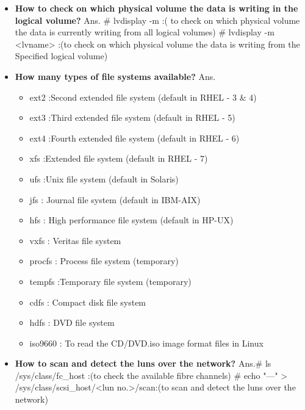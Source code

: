 \begin{enumerate}
\begin{enumerate}
{\begin{itemize}
   \bigskip
   \bigskip

   \item \textbf{How to check on which physical volume the data is writing in the logical volume?}
   \newline
   Ans. # lvdisplay    -m  :( to check  on which physical volume the data is currently writing from all 				logical volumes)
   # lvdisplay   -m   <lvname>	:(to check on which physical volume the data is writing from the Specified   logical volume)

   \bigskip
   \bigskip

   \item \textbf{How many types of file systems available?}
   \newline
   Ans. \begin{itemize}
           \item ext2 :Second extended file system (default in RHEL - 3 & 4)
           \item ext3 :Third extended file system (default in RHEL - 5)
           \item  ext4 :Fourth extended file system (default in RHEL - 6)
           \item  xfs :Extended file system (default in RHEL - 7)
           \item ufs  :Unix file system  (default in Solaris)	
           \item jfs : Journal file system  (default in IBM-AIX)
           \item hfs  : High performance file system (default in HP-UX)
           \item vxfs : Veritas file system
           \item procfs : Process file system (temporary)
           \item tempfs :Temporary file system (temporary)
           \item cdfs : Compact disk file system
           \item hdfs : DVD file system
           \item iso9660 :  To read the CD/DVD.iso image format files in Linux
        \end{itemize}

    \bigskip
    \bigskip

    \item \textbf{How to scan and detect the luns over the network?}
    \newline
    Ans.# ls  /sys/class/fc_host	:(to check the available fibre channels)
      # echo  "---"   >  /sys/class/scsi_host/<lun no.>/scan:(to scan and detect the luns over the network)
    

\end{itemize}}
\end{enumerate}
\end{enumerate}
